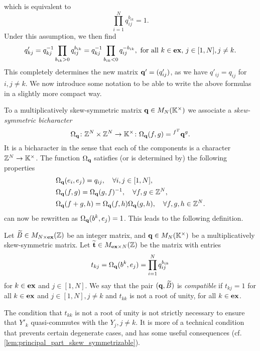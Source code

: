which is equivalent to
\begin{equation}\label{eq:compatibility_q_b}
	\prod_{i=1}^N q_{ij}^{b_{ik}} = 1.
\end{equation}
%
Under this assumption, we then find
\begin{equation}\label{eq:mutated_q_kj}
	q'_{kj} = q_{kj}^{-1} \prod_{b_{ik} > 0}q_{ij}^{b_{ik}} = q_{kj}^{-1} \prod_{b_{ik} < 0}q_{ij}^{-b_{ik}}, \text{ for all } k \in \mathbf{ex},\, j\in [1, N], j\neq k.
\end{equation}
%
This completely determines the new matrix $\mathbf{q}' = (q'_{ij})$, as we have $q'_{ij} =
	q_{ij}$ for $i,j \neq k$. We now introduce some notation to be able to write the above
formulas in a slightly more compact way.

To a multiplicatively skew-symmetric matrix $\mathbf{q} \in M_N(\mathbb{K}^\times)$ we associate a
\emph{skew-symmetric bicharacter}
\begin{equation*}
	\Omega_{\mathbf{q}} \colon \mathbb{Z}^N \times \mathbb{Z}^N \to \mathbb{K}^\times \colon
	\Omega_{\mathbf{q}}(f, g) = \prescript{f^T}{}{}\mathbf{q}^g.
\end{equation*}
%
It is a bicharacter in the sense that each of the components is a character $\mathbb{Z}^N \to
	\mathbb{K}^\times$. The function $\Omega_{\mathbf{q}}$ satisfies (or is determined by) the following
properties
\begin{align}
	 & \Omega_{\mathbf{q}} (e_i, e_j) = q_{ij}, \quad \forall i, j \in [1, N],\label{eq:Omega_of_basis}                             \\
	 & \Omega_{\mathbf{q}} (f, g) = \Omega_{\mathbf{q}} (g, f)^{-1},\quad \forall f, g \in \mathbb{Z}^N,\label{eq:Omega_skew_symmetric}            \\
	 & \Omega_{\mathbf{q}} (f + g, h) = \Omega_{\mathbf{q}}(f, h)\Omega_{\mathbf{q}}(g, h), \quad \forall f, g, h\in \mathbb{Z}^N.\label{eq:Omega_of_sum}
\end{align}
%
 can now be rewritten as $\Omega_{\mathbf{q}}(b^k, e_j) = 1$. This leads to the following definition.
\begin{definition}\label{def:compatible_pair}
	Let $\widetilde{B} \in M_{N \times \mathbf{ex}}(\mathbb{Z})$ be an integer matrix, and $\mathbf{q} \in M_N(\mathbb{K}^\times)$ be a multiplicatively skew-symmetric matrix.	Let $\widetilde{\mathbf{t}}\in M_{\mathbf{ex} \times N}(\mathbb{Z})$ be the matrix with entries
	\begin{equation*}
		t_{kj} = \Omega_{\mathbf{q}}(b^k, e_j) = \prod_{i=1}^N q_{ij}^{b_{ik}}
	\end{equation*}
	for $k \in \mathbf{ex}$ and $j \in [1, N]$. We say that the pair $(\mathbf{q}, \widetilde{B})$ is \emph{compatible} if $t_{kj} = 1$ for all $k \in \mathbf{ex}$ and $j \in [1, N], j\neq k$ and  $t_{kk}$ is not a root of unity, for all $k\in \mathbf{ex}$.
\end{definition}
\begin{remark}
	The condition that $t_{kk}$ is not a root of unity is not strictly necessary to ensure that $Y'_k$ quasi-commutes with the $Y_j, j\neq k$. It is more of a technical condition that prevents certain degenerate cases, and has some useful consequences (cf. \cref{lem:principal_part_skew_symmetrizable}).
\end{remark}
%


